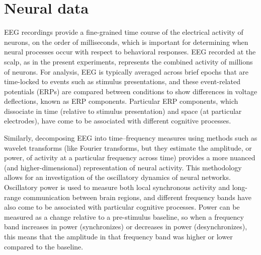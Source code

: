\section{Neural data}


EEG recordings provide a fine-grained time course of the electrical
activity of neurons, on the order of milliseconds, which is important
for determining when neural processes occur with respect to behavioral
responses.  EEG recorded at the scalp, as in the present experiments, represents the combined activity of millions of neurons.  For analysis, EEG is typically averaged across brief
epochs that are time-locked to events such as stimulus presentations,
and these event-related potentials (ERPs) are compared between
conditions to show differences in voltage deflections, known as ERP
components.  Particular ERP components, which dissociate in time
(relative to stimulus presentation) and space (at particular
electrodes), have come to be associated with different cognitive processes.

Similarly, decomposing EEG into time--frequency measures using methods such as wavelet transforms
(like Fourier transforms, but they estimate the amplitude, or power, of
activity at a particular frequency across time) provides a more
nuanced (and higher-dimensional) representation of neural activity.
This methodology allows for an investigation of the oscillatory dynamics of neural
networks.  Oscillatory power is used to measure both local synchronous
activity and long-range communication between brain regions, and
different frequency bands have also come to be associated with particular
cognitive processes.  Power can be measured as a change relative to a pre-stimulus baseline, so when a frequency band increases in power (synchronizes) or decreases in power (desynchronizes), this means that the amplitude in that frequency band was higher or lower compared to the baseline.

